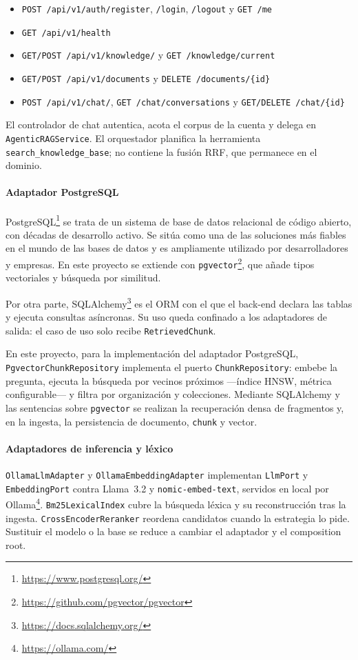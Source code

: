 \begin{itemize}[leftmargin=*, itemsep=0.15em]
  \item \texttt{POST /api/v1/auth/register}, \texttt{/login}, \texttt{/logout} y \texttt{GET /me}
  \item \texttt{GET /api/v1/health}
  \item \texttt{GET/POST /api/v1/knowledge/} y \texttt{GET /knowledge/current}
  \item \texttt{GET/POST /api/v1/documents} y \texttt{DELETE /documents/\{id\}}
  \item \texttt{POST /api/v1/chat/}, \texttt{GET /chat/conversations} y \texttt{GET/DELETE /chat/\{id\}}
\end{itemize}

El controlador de chat autentica, acota el corpus de la cuenta y delega en \texttt{AgenticRAGService}. El orquestador planifica la herramienta \texttt{search\_knowledge\_base}; no contiene la fusión RRF, que permanece en el dominio.

\paragraph{Adaptador PostgreSQL}
PostgreSQL\footnote{\url{https://www.postgresql.org/}} se trata de un sistema de base de datos relacional de código abierto, con décadas de desarrollo activo. Se sitúa como una de las soluciones más fiables en el mundo de las bases de datos y es ampliamente utilizado por desarrolladores y empresas. En este proyecto se extiende con \texttt{pgvector}\footnote{\url{https://github.com/pgvector/pgvector}}, que añade tipos vectoriales y búsqueda por similitud.

Por otra parte, SQLAlchemy\footnote{\url{https://docs.sqlalchemy.org/}} es el ORM con el que el back-end declara las tablas y ejecuta consultas asíncronas. Su uso queda confinado a los adaptadores de salida: el caso de uso solo recibe \texttt{RetrievedChunk}.

En este proyecto, para la implementación del adaptador PostgreSQL, \texttt{PgvectorChunkRepository} implementa el puerto \texttt{ChunkRepository}: embebe la pregunta, ejecuta la búsqueda por vecinos próximos ---índice HNSW, métrica configurable--- y filtra por organización y colecciones. Mediante SQLAlchemy y las sentencias sobre \texttt{pgvector} se realizan la recuperación densa de fragmentos y, en la ingesta, la persistencia de documento, \texttt{chunk} y vector.

\paragraph{Adaptadores de inferencia y léxico}
\texttt{OllamaLlmAdapter} y \texttt{OllamaEmbeddingAdapter} implementan \texttt{LlmPort} y \texttt{EmbeddingPort} contra Llama~3.2 y \texttt{nomic-embed-text}, servidos en local por Ollama\footnote{\url{https://ollama.com/}}. \texttt{Bm25LexicalIndex} cubre la búsqueda léxica y su reconstrucción tras la ingesta. \texttt{CrossEncoderReranker} reordena candidatos cuando la estrategia lo pide. Sustituir el modelo o la base se reduce a cambiar el adaptador y el composition root.

